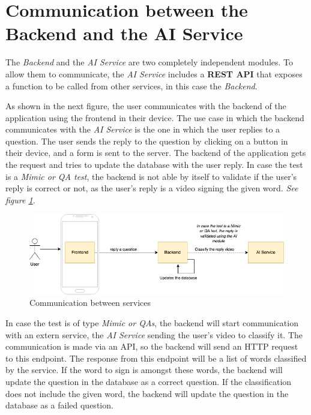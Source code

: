 \newpage
\section{Communication between the Backend and the AI Service}
    The \textit{Backend} and the \textit{AI Service} are two completely independent modules. To allow them to communicate, the \textit{AI Service} includes a \textbf{REST API} 
    that exposes a function to be called from other services, in this case the \textit{Backend}. 

    As shown in the next figure, the user communicates with the backend of the application using the frontend in their device.
    The use case in which the backend communicates with the \textit{AI Service} is the one in which the user replies to a question. The user sends the reply to the question by clicking on a button in their device, and a form is sent to 
    the server. The backend of the application gets the request and tries to update the database with the user reply. In case the test is a \textit{Mimic or QA test}, the backend is not 
    able by itself to validate if the user's reply is correct or not, as the user's reply is a video signing the given word. 
    \textit{See figure \ref{fig:impl_comm}}.

    \begin{figure}[H]
        \centering
            \includegraphics[width=\textwidth]{assets/diagrams/comm.png}
        \caption{Communication between services}
        \label{fig:impl_comm}
    \end{figure}

    In case the test is of type \textit{Mimic or QAs}, the backend will start communication with an extern service, the \textit{AI Service} sending the user's video to classify it. The communication is made via an API, 
    so the backend will send an HTTP request to this endpoint. The response from this endpoint will be a list of words classified by the service. If the word to sign is amongst these words, the backend will 
    update the question in the database as a correct question. If the classification does not include the given word, the backend will update the question in the database as a failed question.

